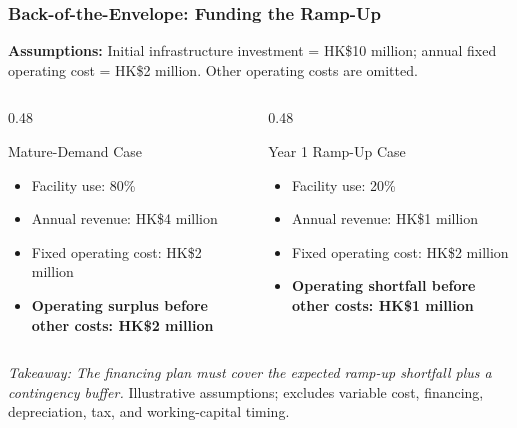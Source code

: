 \documentclass{beamer}
\begin{document}
\begin{frame}[t,shrink=10]
\frametitle{Back-of-the-Envelope: Funding the Ramp-Up}
\textbf{Assumptions:} Initial infrastructure investment = HK\$10 million; annual fixed operating cost = HK\$2 million. Other operating costs are omitted.
\begin{columns}[T]
\begin{column}{0.48\textwidth}\begin{block}{Mature-Demand Case}
\begin{itemize}
\item Facility use: 80\%
\item Annual revenue: HK\$4 million
\item Fixed operating cost: HK\$2 million
\item \textbf{Operating surplus before other costs: HK\$2 million}
\end{itemize}\end{block}\end{column}
\begin{column}{0.48\textwidth}\begin{block}{Year 1 Ramp-Up Case}
\begin{itemize}
\item Facility use: 20\%
\item Annual revenue: HK\$1 million
\item Fixed operating cost: HK\$2 million
\item \textbf{Operating shortfall before other costs: HK\$1 million}
\end{itemize}\end{block}\end{column}
\end{columns}
\textit{Takeaway: The financing plan must cover the expected ramp-up shortfall plus a contingency buffer.}
\vfill{\tiny Illustrative assumptions; excludes variable cost, financing, depreciation, tax, and working-capital timing.}
\end{frame}
\end{document}
